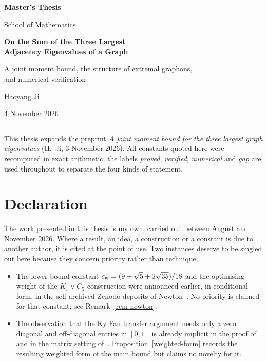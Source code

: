\begin{titlepage}
\centering
\vspace*{1.2cm}
{\Large\bfseries Master's Thesis\par}
\vspace{0.6cm}
{\large School of Mathematics\par}
\vfill
{\LARGE\bfseries On the Sum of the Three Largest\\[0.35cm] Adjacency Eigenvalues of a Graph\par}
\vspace{1.0cm}
{\large A joint moment bound, the structure of extremal graphons,\\ and numerical verification\par}
\vfill
{\large Haoyang Ji\par}
\vspace{0.4cm}
{\normalsize 4 November 2026\par}
\vfill
\rule{0.55\textwidth}{0.4pt}\par
\vspace{0.3cm}
{\small This thesis expands the preprint \emph{A joint moment bound for the three
largest graph eigenvalues} (H.~Ji, 3 November 2026). All constants quoted
here were recomputed in exact arithmetic; the labels \emph{proved},
\emph{verified}, \emph{numerical} and \emph{gap} are used throughout to
separate the four kinds of statement.\par}
\end{titlepage}

\chapter*{Declaration}
The work presented in this thesis is my own, carried out between August and
November 2026. Where a result, an idea, a construction or a constant is due
to another author, it is cited at the point of use. Two instances deserve to
be singled out here because they concern priority rather than technique.

\begin{itemize}[leftmargin=1.6em,itemsep=3pt]
\item The lower-bound constant $c_{\mathrm{w}}=(9+\sqrt5+2\sqrt{35})/18$ and the
optimising weight of the $K_1\vee C_5$ construction were announced earlier,
in conditional form, in the self-archived Zenodo deposits of
Newton~\cite{Newton1,Newton2}. No priority is claimed for that constant;
see Remark~\ref{rem-newton}.
\item The observation that the Ky Fan transfer argument needs only a zero
diagonal and off-diagonal entries in $[0,1]$ is already implicit in the
proof of~\cite[Proposition 6.1]{STW} and in the matrix setting
of~\cite{Mohar}. Proposition~\ref{weighted-form} records the resulting
weighted form of the main bound but claims no novelty for it.
\end{itemize}

